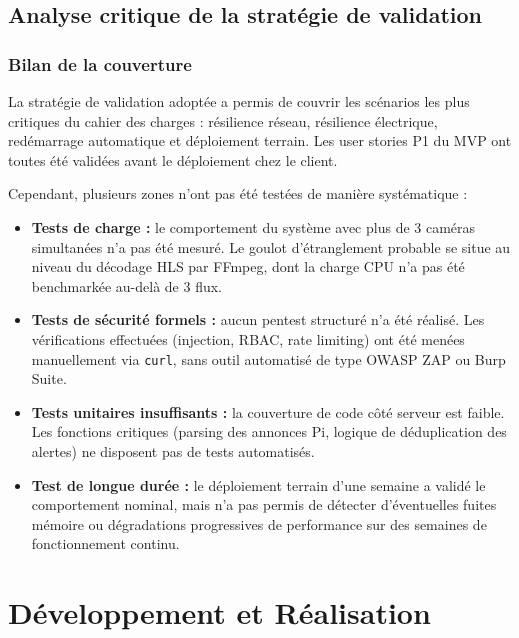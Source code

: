 \documentclass[12pt,a4paper]{article}
\begin{document}
\subsection{Analyse critique de la stratégie de validation}

\subsubsection{Bilan de la couverture}

La stratégie de validation adoptée a permis de couvrir les scénarios les plus critiques du cahier des charges : résilience réseau, résilience électrique, redémarrage automatique et déploiement terrain. Les user stories P1 du MVP ont toutes été validées avant le déploiement chez le client.

Cependant, plusieurs zones n'ont pas été testées de manière systématique :

\begin{itemize}[label=\textbullet]
    \item \textbf{Tests de charge :} le comportement du système avec plus de 3 caméras simultanées n'a pas été mesuré. Le goulot d'étranglement probable se situe au niveau du décodage HLS par FFmpeg, dont la charge CPU n'a pas été benchmarkée au-delà de 3 flux.
    \item \textbf{Tests de sécurité formels :} aucun pentest structuré n'a été réalisé. Les vérifications effectuées (injection, RBAC, rate limiting) ont été menées manuellement via \texttt{curl}, sans outil automatisé de type OWASP ZAP ou Burp Suite.
    \item \textbf{Tests unitaires insuffisants :} la couverture de code côté serveur est faible. Les fonctions critiques (parsing des annonces Pi, logique de déduplication des alertes) ne disposent pas de tests automatisés.
    \item \textbf{Test de longue durée :} le déploiement terrain d'une semaine a validé le comportement nominal, mais n'a pas permis de détecter d'éventuelles fuites mémoire ou dégradations progressives de performance sur des semaines de fonctionnement continu.
\end{itemize}


\section{Développement et Réalisation}
\end{document}
